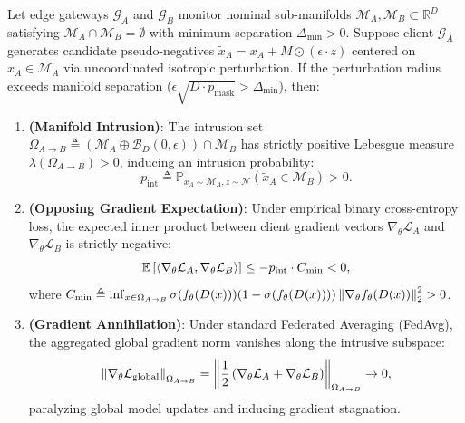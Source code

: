 \begin{theorem}
\label{thm:gradient_cancellation}
Let edge gateways $\mathcal{G}_A$ and $\mathcal{G}_B$ monitor nominal sub-manifolds $\mathcal{M}_A, \mathcal{M}_B \subset \mathbb{R}^D$ satisfying $\mathcal{M}_A \cap \mathcal{M}_B = \emptyset$ with minimum separation $\Delta_{\min} > 0$. Suppose client $\mathcal{G}_A$ generates candidate pseudo-negatives $\tilde{x}_A = x_A + M \odot (\epsilon \cdot z)$ centered on $x_A \in \mathcal{M}_A$ via uncoordinated isotropic perturbation. If the perturbation radius exceeds manifold separation ($\epsilon \sqrt{D \cdot p_{\text{mask}}} > \Delta_{\min}$), then:
\begin{enumerate}
    \item \textbf{(Manifold Intrusion)}: The intrusion set $\Omega_{A \to B} \triangleq (\mathcal{M}_A \oplus \mathcal{B}_D(0, \epsilon)) \cap \mathcal{M}_B$ has strictly positive Lebesgue measure $\lambda(\Omega_{A \to B}) > 0$, inducing an intrusion probability:
    \begin{equation}
    p_{\text{int}} \triangleq \mathbb{P}_{x_A \sim \mathcal{M}_A, z \sim \mathcal{N}}\left( \tilde{x}_A \in \mathcal{M}_B \right) > 0.
    \end{equation}
    \item \textbf{(Opposing Gradient Expectation)}: Under empirical binary cross-entropy loss, the expected inner product between client gradient vectors $\nabla_\theta \mathcal{L}_A$ and $\nabla_\theta \mathcal{L}_B$ is strictly negative:
    \begin{equation}
    \label{eq:thm2_inner_product}
    \mathbb{E}\left[ \left\langle\nabla_\theta \mathcal{L}_A,\nabla_\theta \mathcal{L}_B\right\rangle \right] \le -p_{\text{int}} \cdot C_{\min} < 0,
    \end{equation}
    where $C_{\min} \triangleq \inf_{x \in \Omega_{A \to B}} \sigma(f_\theta(D(x))) (1 - \sigma(f_\theta(D(x)))) \left\lVert\nabla_\theta f_\theta(D(x))\right\rVert_2^2 > 0$.
    \item \textbf{(Gradient Annihilation)}: Under standard Federated Averaging (FedAvg), the aggregated global gradient norm vanishes along the intrusive subspace:
    \begin{equation}
    \left\lVert\nabla_\theta \mathcal{L}_{\text{global}}\right\rVert_{\Omega_{A \to B}} = \left\lVert\frac{1}{2}\left( \nabla_\theta \mathcal{L}_A + \nabla_\theta \mathcal{L}_B \right)\right\rVert_{\Omega_{A \to B}} \to 0,
    \end{equation}
    paralyzing global model updates and inducing gradient stagnation.
\end{enumerate}
\end{theorem}

